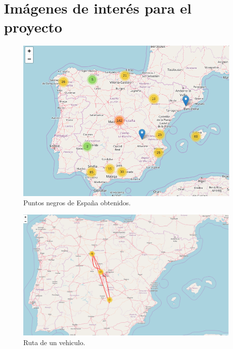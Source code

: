 \chapter{Imágenes de interés para el proyecto\label{apendA}}


\begin{figure}[htp]
\centering
\includegraphics[scale=.50]{Anexos/PuntosNegrosEspana.png}
\caption{Puntos negros de España obtenidos.}
\label{blackShapes}
\end{figure}

\begin{figure}[htp]
\centering
\includegraphics[scale=.30]{Anexos/rutaDeUnVehiculo.png}
\caption{Ruta de un vehiculo.}
\label{littleRoute}
\end{figure}


